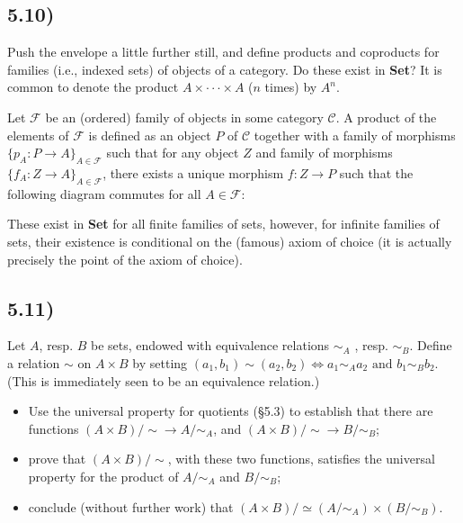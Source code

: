 \documentclass[12pt, letterpaper, twoside]{report}
\begin{document}
\subsection*{5.10)}

Push the envelope a little further still, and deﬁne products and coproducts for families (i.e., indexed sets) of objects of a category. Do these exist in \textbf{Set}? It is common to denote the product $A \times \cdot \cdot \cdot \times A$ ($n$ times) by $A^n$.

Let $\mathcal{F}$ be an (ordered) family of objects in some category $\mathcal{C}$. A product of the elements of $\mathcal{F}$ is defined as an object $P$ of $\mathcal{C}$ together with a family of morphisms $\{p_A : P \to A\}_{A \in \mathcal{F}}$ such that for any object $Z$ and family of morphisms $\{f_A : Z \to A\}_{A \in \mathcal{F}}$, there exists a unique morphism $f : Z \to P$ such that the following diagram commutes for all $A \in \mathcal{F}$:


These exist in \textbf{Set} for all finite families of sets, however, for infinite families of sets, their existence is conditional on the (famous) axiom of choice (it is actually precisely the point of the axiom of choice).




\subsection*{5.11)}

Let $A$, resp. $B$ be sets, endowed with equivalence relations $\sim_A$ , resp. $\sim_B$. Define a relation $\sim$ on $A \times B$ by setting $(a_1, b_1) \sim (a_2, b_2) \Leftrightarrow a_1 \sim_A a_2 \text{ and } b_1 \sim_B b_2.$ (This is immediately seen to be an equivalence relation.)
\begin{itemize}
	\item Use the universal property for quotients (§5.3) to establish that there are functions $(A \times B)/\sim \rightarrow A/\sim_A$, and $(A \times B)/\sim \rightarrow B/\sim_B$;
	\item prove that $(A \times B)/\sim$, with these two functions, satisfies the universal property for the product of $A/\sim_A$ and $B/\sim_B$;
	\item conclude (without further work) that $(A \times B)/ \simeq (A / \sim_A) \times (B / \sim_B)$.
\end{itemize}
\end{document}
